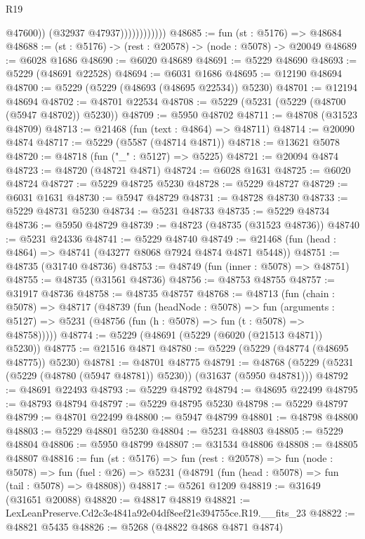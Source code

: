 \begin{lexlean}{R19}
\begin{coremodule}
                              @47600))
                          (@32937 @47937))))))))))))
@48685 := fun (st : @5176) => @48684
@48688 := (st : @5176) -> (rest : @20578) -> (node : @5078) -> @20049
@48689 := @6028 @1686
@48690 := @6020 @48689
@48691 := @5229 @48690
@48693 := @5229 (@48691 @22528)
@48694 := @6031 @1686
@48695 := @12190 @48694
@48700 := @5229 (@5229 (@48693 (@48695 @22534)) @5230)
@48701 := @12194 @48694
@48702 := @48701 @22534
@48708 := @5229 (@5231 (@5229 (@48700 (@5947 @48702)) @5230))
@48709 := @5950 @48702
@48711 := @48708 (@31523 @48709)
@48713 := @21468 (fun (text : @4864) => @48711)
@48714 := @20090 @4874
@48717 := @5229 (@5587 (@48714 @4871))
@48718 := @13621 @5078
@48720 := @48718 (fun ("_" : @5127) => @5225)
@48721 := @20094 @4874
@48723 := @48720 (@48721 @4871)
@48724 := @6028 @1631
@48725 := @6020 @48724
@48727 := @5229 @48725 @5230
@48728 := @5229 @48727
@48729 := @6031 @1631
@48730 := @5947 @48729
@48731 := @48728 @48730
@48733 := @5229 @48731 @5230
@48734 := @5231 @48733
@48735 := @5229 @48734
@48736 := @5950 @48729
@48739 := @48723 (@48735 (@31523 @48736))
@48740 := @5231 @24336
@48741 := @5229 @48740
@48749 := @21468 (fun (head : @4864) => @48741 (@43277 @8068 @7924 @4874 @4871 @5448))
@48751 := @48735 (@31740 @48736)
@48753 := @48749 (fun (inner : @5078) => @48751)
@48755 := @48735 (@31561 @48736)
@48756 := @48753 @48755
@48757 := @31917 @48736
@48758 := @48735 @48757
@48768 := @48713
    (fun (chain : @5078) =>
    @48717
      (@48739
        (fun (headNode : @5078) =>
        fun (arguments : @5127) => @5231 (@48756 (fun (h : @5078) => fun (t : @5078) => @48758)))))
@48774 := @5229 (@48691 (@5229 (@6020 (@21513 @4871)) @5230))
@48775 := @21516 @4871
@48780 := @5229 (@5229 (@48774 (@48695 @48775)) @5230)
@48781 := @48701 @48775
@48791 := @48768 (@5229 (@5231 (@5229 (@48780 (@5947 @48781)) @5230)) (@31637 (@5950 @48781)))
@48792 := @48691 @22493
@48793 := @5229 @48792
@48794 := @48695 @22499
@48795 := @48793 @48794
@48797 := @5229 @48795 @5230
@48798 := @5229 @48797
@48799 := @48701 @22499
@48800 := @5947 @48799
@48801 := @48798 @48800
@48803 := @5229 @48801 @5230
@48804 := @5231 @48803
@48805 := @5229 @48804
@48806 := @5950 @48799
@48807 := @31534 @48806
@48808 := @48805 @48807
@48816 := fun (st : @5176) =>
  fun (rest : @20578) =>
  fun (node : @5078) =>
  fun (fuel : @26) => @5231 (@48791 (fun (head : @5078) => fun (tail : @5078) => @48808))
@48817 := @5261 @1209
@48819 := @31649 (@31651 @20088)
@48820 := @48817 @48819
@48821 := LexLeanPreserve.Cd2c3e4841a92e04df8eef21e394755ce.R19.__fits_23
@48822 := @48821 @5435
@48826 := @5268 (@48822 @4868 @4871 @4874)

\end{coremodule}
\end{lexlean}

